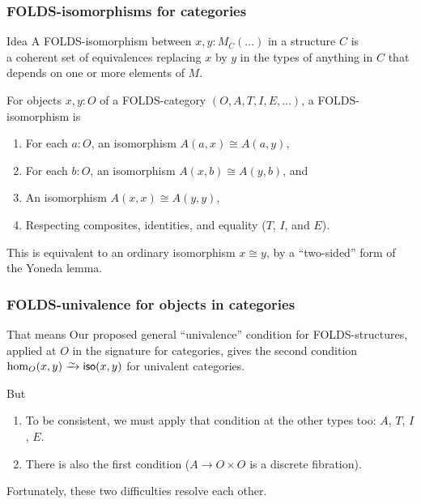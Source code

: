 \documentclass{beamer}
\begin{document}
\begin{frame}
  \frametitle{FOLDS-isomorphisms for categories}
  \begin{block}{Idea}
    A FOLDS-isomorphism between $x,y:M_C(\dots)$ in a structure $C$ is\\\alert<1>{a coherent set of equivalences replacing $x$ by $y$ in the types of anything in $C$ that depends on one or more elements of $M$}.
  \end{block}
  \pause
  \begin{example}
  For objects $x,y:O$ of a FOLDS-category $(O,A,T,I,E,\dots)$, a FOLDS-isomorphism is
  \begin{enumerate}
  \item For each $a:O$, an isomorphism $A(a,x) \cong A(a,y)$,
  \item For each $b:O$, an isomorphism $A(x,b) \cong A(y,b)$, and
  \item An isomorphism $A(x,x) \cong A(y,y)$,
  \item Respecting composites, identities, and equality ($T$, $I$, and $E$).
  \end{enumerate}
\end{example}
  \pause
  This is equivalent to an ordinary isomorphism $x\cong y$, by a ``two-sided'' form of the Yoneda lemma.
\end{frame}

\begin{frame}
  \frametitle{FOLDS-univalence for objects in categories}
  \begin{block}{That means}
    Our proposed general ``univalence'' condition for FOLDS-structures, applied at $O$ in the signature for categories, gives the second condition $\hom_O(x,y) \toiso \mathsf{iso}(x,y)$ for univalent categories.
  \end{block}
  \begin{block}{But}
    \begin{enumerate}
    \item To be consistent, we must apply that condition at the other types too: $A$, $T$, $I$, $E$.
    \item There is also the first condition ($A\to O\times O$ is a discrete fibration).
    \end{enumerate}
  \end{block}
  Fortunately, these two difficulties resolve each other.
\end{frame}
\end{document}
